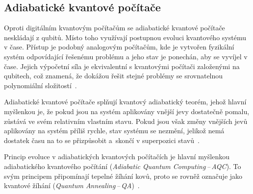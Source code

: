 \subsection{Adiabatické kvantové počítače}
Oproti digitálním kvantovým počítačům se adiabatické kvantové počítače neskládají z qubitů. 
Místo toho využívají postupnou evoluci kvantového systému v čase. 
Přístup je podobný analogovým počítačům, kde je vytvořen fyzikální systém odpovídající řešenému problému a jeho stav je ponechán, aby se vyvíjel v čase. 
Jejich výpočetní síla je ekvivalentní s kvantovými počítači založenými na qubitech, což znamená, že dokážou řešit stejné problémy se srovnatelnou polynomiální složitostí~\cite{NaturalComputing}.

Adiabatické kvantové počítače splňují kvantový adiabatický teorém, jehož hlavní myšlenkou je, že pokud jsou na systém aplikovány vnější jevy dostatečně pomalu, zůstává ve svém relativním vlastním stavu. 
Pokud jsou však změny vnějších jevů aplikovány na systém příliš rychle, stav systému se nezmění, jelikož nemá dostatek času na to se přizpůsobit a~skončí v superpozici stavů~\cite{NaturalComputing}. 

Princip evoluce v adiabatických kvantových počítačích je hlavní myšlenkou adiabatického kvantového počítání (\emph{Adiabatic Quantum Computing\,--\,AQC}). 
To svým principem připomínají tepelné žíhání kovů, proto se rovněž označuje jako kvantové žíhání (\emph{Quantum Annealing\,--\,QA})~\cite{NaturalComputing}. 
